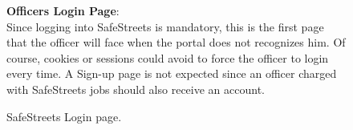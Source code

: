 \begin{figure}
	\begin{flushleft}
		\textbf{Officers Login Page}:\\
		Since logging into SafeStreets is mandatory, this is the first page that the officer will face when the portal does not recognizes him. Of course, cookies or sessions could avoid to force the officer to login every time. A Sign-up page is not expected since an officer charged with SafeStreets jobs should also receive an account.
	\end{flushleft}
	\centering
	\caption{SafeStreets Login page.}
	\label{fig:login2}
\end{figure}
\clearpage
